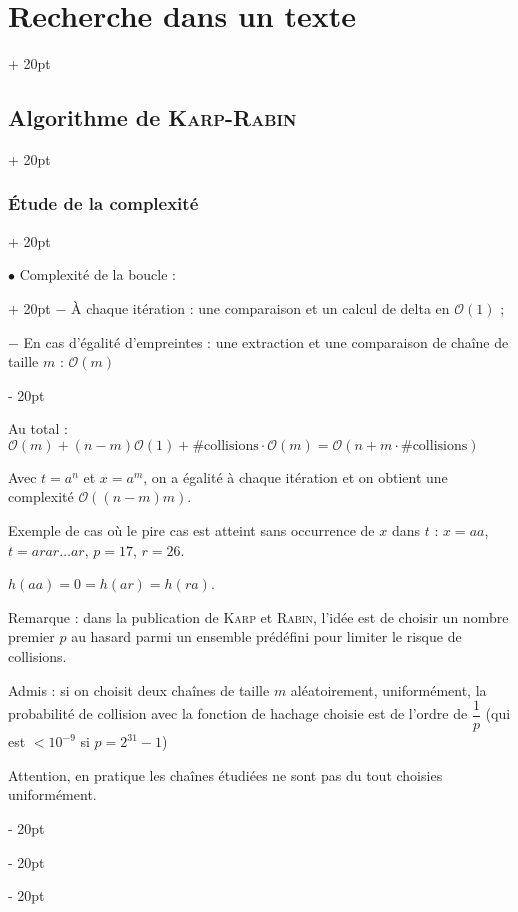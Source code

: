 \documentclass[a4paper, 12pt, twoside]{article}
\newcommand{\ind}[1][20pt]{\advance\leftskip + #1}
\newcommand{\deind}[1][20pt]{\advance\leftskip - #1}
\newenvironment{indt}[2][20pt]{#2 \par \ind[#1]}{\par \deind} %
\begin{document}
\begin{indt}{\section{Recherche dans un texte}}
\begin{indt}{\subsection{Algorithme de \textsc{Karp-Rabin}}}
\begin{indt}{\subsubsection{\'Etude de la complexité}}
                \vspace{12pt}
                
                \begin{indt}{$\bullet$ Complexité de la boucle :}
                    $-$ \`A chaque itération :  une comparaison et un calcul de delta en $\mathcal O(1)$ ;

                    $-$ En cas d'égalité d'empreintes : une extraction et une comparaison de chaîne de taille $m$ : $\mathcal O(m)$
                \end{indt}

                \vspace{12pt}
                
                Au total : $\mathcal O(m) + (n - m) \mathcal O(1) + \#\mathrm{collisions} \cdot \mathcal O(m) = \mathcal O(n + m \cdot \#\mathrm{collisions})$

                Avec $t = a^n$ et $x = a^m$, on a égalité à chaque itération et on obtient une complexité $\mathcal O((n - m)m)$.

                \vspace{6pt}
                
                Exemple de cas où le pire cas est atteint sans occurrence de $x$ dans $t$ :
                $x = aa$, $t = arar \ldots ar$, $p = 17$, $r = 26$.

                $h(aa) = 0 = h(ar) = h(ra)$.

                \vspace{12pt}
                
                Remarque : dans la publication de \textsc{Karp} et \textsc{Rabin}, l'idée est de choisir un nombre premier $p$ au hasard parmi un ensemble prédéfini pour limiter le risque de collisions.

                \vspace{12pt}
                
                Admis : si on choisit deux chaînes de taille $m$ aléatoirement, uniformément, la probabilité de collision avec la fonction de hachage choisie est de l'ordre de $\dfrac 1 p$ (qui est $< 10^{-9}$ si $p = 2^{31} - 1$)

                Attention, en pratique les chaînes étudiées ne sont pas du tout choisies uniformément.
            \end{indt}

            \vspace{12pt}
            

\end{indt}
\end{indt}
\end{document}
